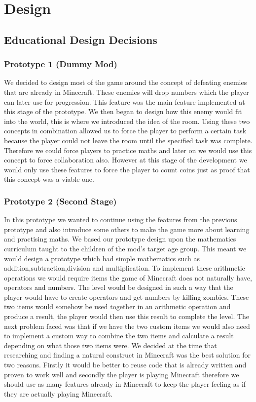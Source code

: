 \chapter{Design}
\label{ch:design}

\section{Educational Design Decisions}
\subsection{Prototype 1 (Dummy Mod)}
We decided to design most of the game around the concept of defeating enemies that are already in Minecraft. These enemies will drop numbers which the player can later use for progression. This feature was the main feature implemented at this stage of the prototype. We then began to design how this enemy would fit into the world, this is where we introduced the idea of the room. Using these two concepts in combination allowed us to force the player to perform a certain task because the player could not leave the room until the specified task was complete. Therefore we could force players to practice maths and later on we would use this concept to force collaboration also. However at this stage of the development we would only use these features to force the player to count coins just as proof that this concept was a viable one.

\subsection{Prototype 2 (Second Stage)}
In this prototype we wanted to continue using the features from the previous prototype and also introduce some others to make the game more about learning and practising maths. We based our prototype design upon the mathematics curriculum taught to the children of the mod’s target age group. This meant we would design a prototype which had simple mathematics such as addition,subtraction,division and multiplication. To implement these arithmetic operations we would require items the game of Minecraft does not naturally have, operators and numbers. The level would be designed in such a way that the player would have to create operators and get numbers by killing zombies. These two items would somehow be used together in an arithmetic operation and produce a result, the player would then use this result to complete the level. The next problem faced was that if we have the two custom items we would also need to implement a custom way to combine the two items and calculate a result depending on what those two items were. We decided at the time that researching and finding a natural construct in Minecraft was the best solution for two reasons. Firstly it would be better to reuse code that is already written and proven to work well and secondly the player is playing Minecraft therefore we should use as many features already in Minecraft to keep the player feeling as if they are actually playing Minecraft.

